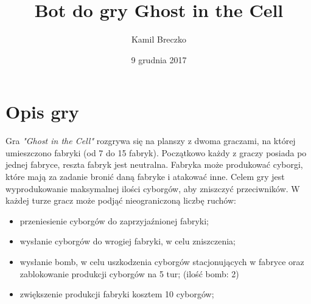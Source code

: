 \documentclass[a4paper]{mwart}
\author{Kamil Breczko}
\title{Bot do gry Ghost in the Cell}
\date{9 grudnia 2017}
\begin{document}
\maketitle
\thispagestyle{empty}

\newpage

\tableofcontents
\thispagestyle{empty}

\newpage
\section{Opis gry}
Gra \emph{"Ghost in the Cell"} rozgrywa się na planszy z dwoma graczami, na której umieszczono fabryki (od 7 do 15 fabryk). Początkowo każdy z graczy posiada po jednej fabryce, reszta fabryk jest neutralna. Fabryka może produkować cyborgi, które mają za zadanie bronić daną fabryke i atakować inne. Celem gry jest wyprodukowanie maksymalnej ilości cyborgów, aby zniszczyć przeciwników.
W każdej turze gracz może podjąć nieograniczoną liczbę ruchów:
\begin{itemize}
 \item przeniesienie cyborgów do zaprzyjaźnionej fabryki;
 \item wysłanie cyborgów do wrogiej fabryki, w celu zniszczenia;
 \item wysłanie bomb, w celu uszkodzenia cyborgów stacjonujących w fabryce oraz zablokowanie produkcji cyborgów na 5 tur; (ilość bomb: 2)
 \item zwiększenie produkcji fabryki kosztem 10 cyborgów;
\end{itemize}
\end{document}
